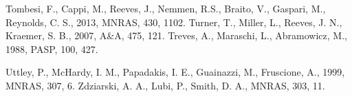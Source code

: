 \documentclass[useAMS,usenatbib]{sam}
\begin{document}
\begin{thebibliography}{99}
     Tombesi, F., Cappi, M., Reeves, J., Nemmen, R.S., Braito, V., Gaspari, M., Reynolds, C. S., 2013,
    MNRAS, 430, 1102.
     Turner, T., Miller, L., Reeves, J. N., Kraemer, S. B., 2007, A\&A, 475, 121.
     Treves, A., Maraschi, L., Abramowicz, M., 1988, PASP, 100, 427.
    
     Uttley, P., McHardy, I. M., Papadakis, I. E., Guainazzi, M., Fruscione, A., 1999, MNRAS, 307, 6.
     Zdziarski, A. A., Lubi, P., Smith, D. A., MNRAS, 303, 11.
    
\end{thebibliography}

\label{lastpage}
\end{document}
